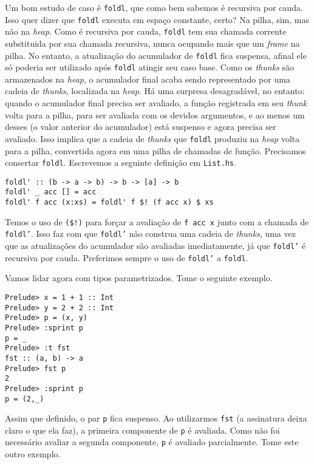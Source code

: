 \documentclass[a4paper]{article}
\begin{document}
Um bom estudo de caso é \texttt{foldl}, que como bem sabemos é recursiva por cauda.
Isso quer dizer que \texttt{foldl} executa em espaço constante, certo?
Na pilha, sim, mas não na \emph{heap}.
Como é recursiva por cauda, \texttt{foldl} tem sua chamada corrente substituida por sua chamada recursiva, nunca ocupando mais que um \emph{frame} na pilha.
No entanto, a atualização do acumulador de \texttt{foldl} fica suspensa, afinal ele só poderia ser utilizado após \texttt{foldl} atingir seu caso base.
Como os \emph{thunks} são armazenados na \emph{heap}, o acumulador final acaba sendo representado por uma cadeia de \emph{thunks}, localizada na \emph{heap}.
Há uma surpresa desagradável, no entanto: quando o acumulador final precisa ser avaliado, a função registrada em seu \emph{thunk} volta para a pilha, para ser avaliada com os devidos argumentos, e ao menos um desses (o valor anterior do acumulador) está suspenso e agora precisa ser avaliado.
Isso implica que a cadeia de \emph{thunks} que \texttt{foldl} produziu na \emph{heap} volta para a pilha, convertida agora em uma pilha de chamadas de função.
Precisamos consertar \texttt{foldl}.
Escrevemos a seguinte definição em \texttt{List.hs}.

\begin{verbatim}
foldl' :: (b -> a -> b) -> b -> [a] -> b
foldl' _ acc [] = acc
foldl' f acc (x:xs) = foldl' f $! (f acc x) $ xs
\end{verbatim}

Temos o uso de \texttt{(\$!)} para forçar a avaliação de \texttt{f acc x} junto com a chamada de \texttt{foldl'}.
Isso faz com que \texttt{foldl'} não construa uma cadeia de \emph{thunks}, uma vez que as atualizações do acumulador são avaliadas imediatamente, já que \texttt{foldl'} é recursiva por cauda.
Preferimos sempre o uso de \texttt{foldl'} a \texttt{foldl}.

Vamos lidar agora com tipos parametrizados.
Tome o seguinte exemplo.

\begin{verbatim}
Prelude> x = 1 + 1 :: Int
Prelude> y = 2 + 2 :: Int
Prelude> p = (x, y)
Prelude> :sprint p
p = _
Prelude> :t fst
fst :: (a, b) -> a
Prelude> fst p
2
Prelude> :sprint p
p = (2,_)
\end{verbatim}

Assim que definido, o par \texttt{p} fica suspenso.
Ao utilizarmos \texttt{fst} (a assinatura deixa claro o que ela faz), a primeira componente de \texttt{p} é avaliada.
Como não foi necessário avaliar a segunda componente, \texttt{p} é avaliado parcialmente.
Tome este outro exemplo.
\end{document}
